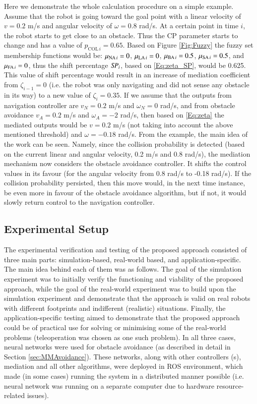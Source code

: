 Here we demonstrate the whole calculation procedure on a simple example. Assume that the robot is going toward the goal point with a linear velocity of $v=0.2$ m/s and angular velocity of $\omega = 0.8$ rad/s. At a certain point in time $i$, the robot starts to get close to an obstacle. Thus the CP parameter starts to change and has a value of $p_{\textrm{COL}\,i}=0.65$. Based on Figure \ref{Fig:Fuzzy} the fuzzy set membership functions would be: $\mu_{{\textrm{NA}}\,i}=0$, $\mu_{{\textrm{LA}}\,i}=0$, $\mu_{{\textrm{BA}}\,i}=0.5$, $\mu_{{\textrm{SA}}\,i}=0.5$, and $\mu_{{\textrm{FA}}\,i}=0$, thus the shift percentage $\mathit{SP}_i$, based on \cref{Eq:zeta_SP}, would be 0.625. This value of shift percentage would result in an increase of mediation coefficient from $\zeta_{i-1} = 0$ (i.e. the robot was only navigating and did not sense any obstacle in its way) to a new value of $\zeta_i=0.35$. If we assume that the outputs from navigation controller are $v_N = 0.2$ m/s and $\omega_N = 0$ rad/s, and from obstacle avoidance $v_A = 0.2$ m/s and $\omega_A = -2$ rad/s, then based on \cref{Eq:zeta} the mediated outputs would be $v = 0.2$ m/s (not taking into account the above mentioned threshold) and $\omega = -0.18$ rad/s. From the example, the main idea of the work can be seen. Namely, since the collision probability is detected (based on the current linear and angular velocity, 0.2 m/s and 0.8 rad/s), the mediation mechanism now considers the obstacle avoidance controller. It shifts the control values in its favour (for the angular velocity from 0.8 rad/s to -0.18 rad/s). If the collision probability persisted, then this move would, in the next time instance, be even more in favour of the obstacle avoidance algorithm, but if not, it would slowly return control to the navigation controller.

\subsection{Experimental Setup}
\label{sec:MediationExperiment}

The experimental verification and testing of the proposed approach consisted of three main parts: simulation-based, real-world based, and application-specific. The main idea behind each of them was as follows. The goal of the simulation experiment was to initially verify the functioning and viability of the proposed approach, while the goal of the real-world experiment was to build upon the simulation experiment and demonstrate that the approach is valid on real robots with different footprints and indifferent (realistic) situations. Finally, the application-specific testing aimed to demonstrate that the proposed approach could be of practical use for solving or minimising some of the real-world problems (teleoperation was chosen as one such problem). 
In all three cases, neural networks were used for obstacle avoidance (as described in detail in Section \ref{sec:MMAvoidance}). These networks, along with other controllers (s), mediation and all other algorithms, were deployed in ROS environment, which made (in some cases) running the system in a distributed manner possible (i.e. neural network was running on a separate computer due to hardware resource-related issues).

